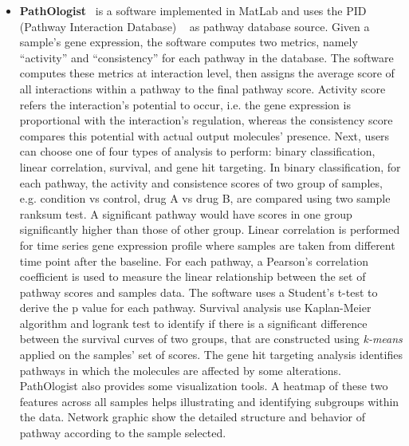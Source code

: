 \documentclass[Minh_PhD_thesis.tex]{subfiles}
\begin{document}
\begin{itemize}
\item \textbf{PathOlogist}~\cite{Greenblum:2011} is a software implemented in MatLab  and uses the PID (Pathway Interaction Database) ~\cite{Schaefer:2009qf} as pathway database source.
Given a sample's gene expression, the software computes two metrics, namely ``activity'' and ``consistency'' for each pathway in the database. 
The software computes these metrics at interaction level, then assigns the average score of all interactions within a pathway to the final pathway score.
Activity score refers the interaction's potential to occur, i.e. the gene expression is proportional with the interaction's regulation, whereas the consistency score compares this potential with actual output molecules' presence.
Next, users can choose one of four types of analysis to perform: binary classification, linear correlation, survival, and gene hit targeting. 
In binary classification, for each pathway, the activity and consistence scores of two group of samples, e.g. condition vs control, drug A vs drug B, are compared using two sample ranksum test. A significant pathway would have scores in one group significantly higher than those of other group. 
Linear correlation is performed for time series gene expression profile where samples are taken from different time point after the baseline. For each pathway, a Pearson's correlation coefficient is used to measure the linear relationship between the set of pathway scores and samples data. The software uses a Student's t-test to derive the p value for each pathway. 
Survival analysis use Kaplan-Meier algorithm and logrank test to identify if there is a significant difference between the survival curves of two groups, that are constructed using \textit{k-means} applied on the samples' set of scores.
The gene hit targeting analysis identifies pathways in which the molecules are affected by some alterations.
PathOlogist also provides some visualization tools. A heatmap of these two features across all samples helps illustrating and identifying subgroups within the data. Network graphic show the detailed structure and behavior of pathway according to the sample selected.


\end{itemize}
\end{document}
